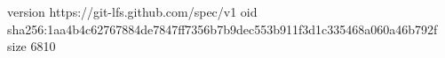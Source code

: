 version https://git-lfs.github.com/spec/v1
oid sha256:1aa4b4c62767884de7847ff7356b7b9dec553b911f3d1c335468a060a46b792f
size 6810
